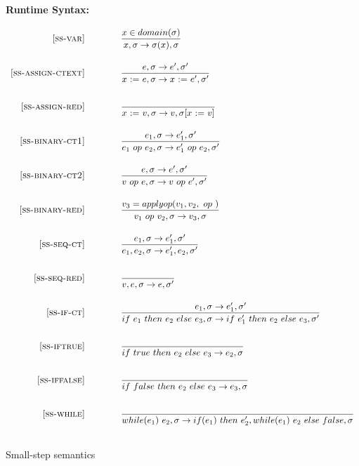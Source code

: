 \documentclass{article}
\begin{document}
\begin{figure}[H]\label{fig:smallstep}
\caption{Small-step semantics }
{\bf Runtime Syntax:}

\[
\begin{array}{r@{\qquad\qquad}l}
\ssrule{ss-var}
{
  x \in domain(\sigma)
}
{
  {x},{\sigma}\rightarrow{\sigma(x)},{\sigma}
}
\ssrule{ss-assign-ctext}
{
	{e},{\sigma}\rightarrow{e'},{\sigma'}
}
{
	{\assign{x}{e}},{\sigma}\rightarrow{\assign{x}{e'}},{\sigma'}
  
}
\ssrule{ss-assign-red}
{}
{
	{\assign{x}{v}},{\sigma}\rightarrow{v},{\sigma[{\assign{x}{v}}]}
  
}

\ssrule{ss-binary-ct1}
{
e_1,\sigma\rightarrow{e_1',\sigma'}
}
{
{e_1} ~op~ {e_2},\sigma \rightarrow {e_1'} ~op~ {e_2},\sigma'
}
\ssrule{ss-binary-ct2}
{
e,\sigma\rightarrow{e',\sigma'}
}
{
{v} ~op~ {e},\sigma \rightarrow {v} ~op~ {e'},\sigma'
}
\ssrule{ss-binary-red}
{
  v_3 =apply op( v_1,v_2, ~op~)
}
{
  {v_1} ~op~ {v_2},\sigma \rightarrow {v_3},\sigma
}

\ssrule{ss-seq-ct}
{e_1,\sigma\rightarrow e_1',\sigma'}
{
e_1,e_2,\sigma\rightarrow e_1',e_2,\sigma'
}

\ssrule{ss-seq-red}
{}
{
v,e,\sigma\rightarrow e,\sigma'
}
\ssrule{ss-if-ct}
{e_1,\sigma \rightarrow e_1',\sigma'}
{if ~e_1~ then~ e_2~ else~ e_3, \sigma \rightarrow if ~e_1'~ then ~e_2~ else~ e_3,\sigma'}

\ssrule{ss-iftrue}
{}
{
  if~true~then~e_2~else~e_3\rightarrow e_2,\sigma
}
\ssrule{ss-iffalse}
{}
{
  if~false~then~e_2~else~e_3\rightarrow e_3,\sigma
}


\ssrule{ss-while}
{}
{
  while(e_1) ~{e_2},\sigma \rightarrow if(e_1)~then~e_2',while(e_1)~e_2~else~false,\sigma
}

\end{array}
\]
\end{figure}
\end{document}
